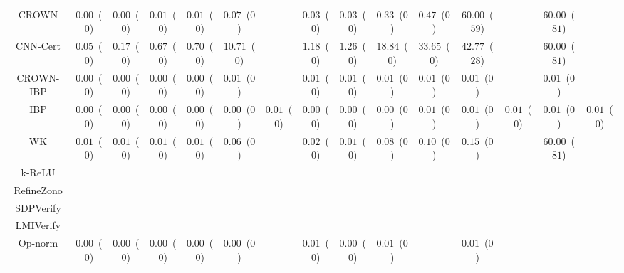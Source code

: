 \begin{table*}
{\begin{tabular}{c|c|c|c|c|c|c|c|c|c|c|c|c|c|c}
        CROWN &  $0.00$~($0$) &  $0.00$~($0$) &  $0.01$~($0$) &  $0.01$~($0$) &  $0.07$~($0$) &               &  $0.03$~($0$) &  $0.03$~($0$) &  $0.33$~($0$) &  $0.47$~($0$) & $60.00$~($59$) &               & $60.00$~($81$) &               \\
     CNN-Cert &  $0.05$~($0$) &  $0.17$~($0$) &  $0.67$~($0$) &  $0.70$~($0$) & $10.71$~($0$) &               &  $1.18$~($0$) &  $1.26$~($0$) & $18.84$~($0$) & $33.65$~($0$) & $42.77$~($28$) &               & $60.00$~($81$) &               \\
    CROWN-IBP &  $0.00$~($0$) &  $0.00$~($0$) &  $0.00$~($0$) &  $0.00$~($0$) &  $0.01$~($0$) &               &  $0.01$~($0$) &  $0.01$~($0$) &  $0.01$~($0$) &  $0.01$~($0$) &  $0.01$~($0$) &               &  $0.01$~($0$) &               \\
          IBP &  $0.00$~($0$) &  $0.00$~($0$) &  $0.00$~($0$) &  $0.00$~($0$) &  $0.00$~($0$) &  $0.01$~($0$) &  $0.00$~($0$) &  $0.00$~($0$) &  $0.00$~($0$) &  $0.01$~($0$) &  $0.01$~($0$) &  $0.01$~($0$) &  $0.01$~($0$) &  $0.01$~($0$) \\
           WK &  $0.01$~($0$) &  $0.01$~($0$) &  $0.01$~($0$) &  $0.01$~($0$) &  $0.06$~($0$) &               &  $0.02$~($0$) &  $0.01$~($0$) &  $0.08$~($0$) &  $0.10$~($0$) &  $0.15$~($0$) &               & $60.00$~($81$) &               \\
       k-ReLU &               &               &               &               &               &               &               &               &               &               &               &               &               &               \\
   RefineZono &               &               &               &               &               &               &               &               &               &               &               &               &               &               \\
    SDPVerify &               &               &               &               &               &               &               &               &               &               &               &               &               &               \\
    LMIVerify &               &               &               &               &               &               &               &               &               &               &               &               &               &               \\
      Op-norm &  $0.00$~($0$) &  $0.00$~($0$) &  $0.00$~($0$) &  $0.00$~($0$) &  $0.00$~($0$) &               &  $0.01$~($0$) &  $0.00$~($0$) &  $0.01$~($0$) &               &  $0.01$~($0$) &               &               &               \\

\end{tabular}}
\end{table*}

